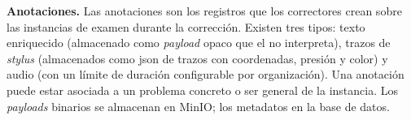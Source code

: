 
\item \textbf{Anotaciones.} \label{rf:annotations}
Las anotaciones son los registros que los correctores crean sobre las instancias de examen
durante la corrección. Existen tres tipos: texto enriquecido (almacenado como
\textit{payload} opaco que el  no interpreta), trazos de \textit{stylus}
(almacenados como \acs{json} de trazos con coordenadas, presión y color) y audio (con un
límite de duración configurable por organización). Una anotación puede estar asociada a un
problema concreto o ser general de la instancia. Los \textit{payloads} binarios se
almacenan en MinIO; los metadatos en la base de datos.

